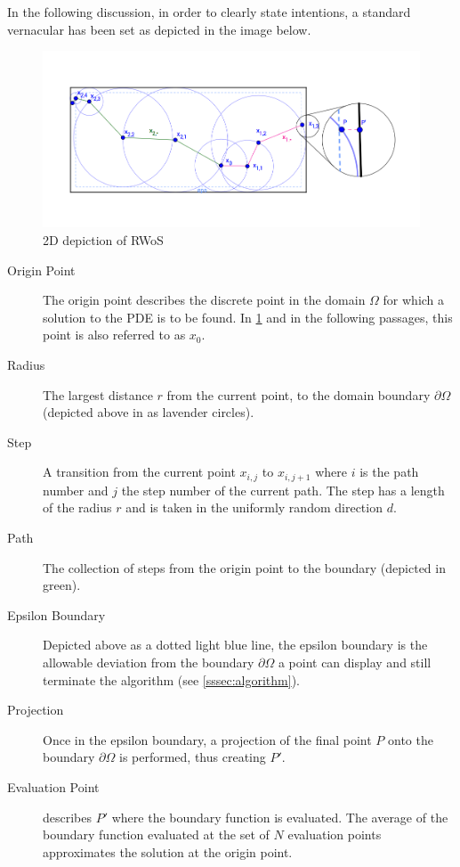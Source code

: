 In the following discussion, in order to clearly state intentions, a standard
vernacular has been set as depicted in the image below.

\begin{figure}
  \label{diagram}
\includegraphics[width=15.0cm]{styles/WoS}
  \caption{2D depiction of \Gls{RWoS}}
\end{figure}

\begin{description}
\item[Origin Point] The origin point describes the discrete point in the domain
$\Omega$ for which a solution to the PDE is to be found. In \ref{diagram}
and in the following passages, this point is also referred to as $x_{0}$.
\item[Radius] The largest distance $r$ from the current point, to the domain boundary
$\partial\Omega$ (depicted above in as lavender circles).
\item[Step] A transition from the current point $x_{i,j}$ to $x_{i,j+1}$ where
$i$ is the path number and $j$ the step number of the current path.  The step has
a length of the radius $r$ and is taken in the uniformly random direction $d$.
\item[Path] The collection of steps from the origin point to the boundary (depicted in green).
\item[Epsilon Boundary] Depicted above as a dotted light blue line, the epsilon boundary
is the allowable deviation from the boundary $\partial\Omega$ a point can display
and still terminate the algorithm (see \ref{sssec:algorithm}).
\item[Projection] Once in the epsilon boundary, a projection of the final point $P$
onto the boundary $\partial\Omega$ is performed, thus creating $P'$.
\item[Evaluation Point] describes $P'$ where the boundary function is evaluated.
The average of the boundary function evaluated at the set of $N$ evaluation points
approximates the solution at the origin point.
\end{description}

